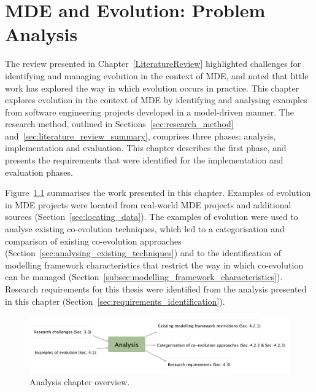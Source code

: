 
\chapter{MDE and Evolution: Problem Analysis}
\label{Analysis}
The review presented in Chapter~\ref{LiteratureReview} highlighted challenges for identifying and managing evolution in the context of MDE, and noted that little work has explored the way in which evolution occurs in practice. This chapter explores evolution in the context of MDE by identifying and analysing examples from software engineering projects developed in a model-driven manner. The research method, outlined in Sections~\ref{sec:research_method} and~\ref{sec:literature_review_summary}, comprises three phases: analysis, implementation and evaluation. This chapter describes the first phase, and presents the requirements that were identified for the implementation and evaluation phases.

Figure~\ref{fig:analysis_overview} summarises the work presented in this chapter. Examples of evolution in MDE projects were located from real-world MDE projects and additional sources (Section~\ref{sec:locating_data}). The examples of evolution were used to analyse existing co-evolution techniques, which led to a categorisation and comparison of existing co-evolution approaches (Section~\ref{sec:analysing_existing_techniques}) and to the identification of modelling framework characteristics that restrict the way in which co-evolution can be managed (Section~\ref{subsec:modelling_framework_characteristics}). Research requirements for this thesis were identified from the analysis presented in this chapter (Section~\ref{sec:requirements_identification}).


\begin{figure}[htbp]
  \begin{center}
    \leavevmode
    \includegraphics[width=12cm]{4.Analysis/overview.pdf}
  \end{center}
  \caption{Analysis chapter overview.}
  \label{fig:analysis_overview}
\end{figure}


